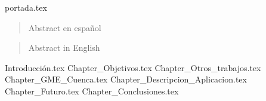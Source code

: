 \documentclass[a4paper,openany,oneside,12pt]{report}
\begin{document}

	{portada.tex}
	\newpage
	\mbox{}
	\thispagestyle{empty} %
	\pagestyle{fancy}

\onehalfspace


\begin{abstract}
	\setcounter{page}{2}
	Abstract en español
	\thispagestyle{plain}
\end{abstract}
\begin{abstract}
	\setcounter{page}{3}
	Abstract in English
	\thispagestyle{plain}
\end{abstract}



	\setcounter{page}{4}
	\tableofcontents
	\listoffigures %
	\listoftables
	


	

	{Introducción.tex}
	{Chapter_Objetivos.tex}
	{Chapter_Otros_trabajos.tex}
	{Chapter_GME_Cuenca.tex}
	{Chapter_Descripcion_Aplicacion.tex}
	{Chapter_Futuro.tex}
	{Chapter_Conclusiones.tex}
	
	



	
\end{document}
